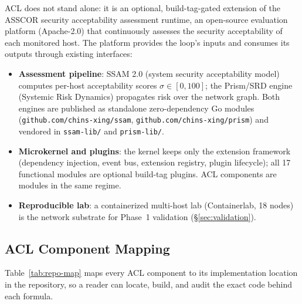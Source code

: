 \documentclass[11pt]{article}
\begin{document}
ACL does not stand alone: it is an optional, build-tag-gated extension of the
ASSCOR security acceptability assessment runtime, an open-source evaluation
platform (Apache-2.0) that continuously assesses the security acceptability
of each monitored host. The platform provides the loop's inputs and
consumes its outputs through existing interfaces:
\begin{itemize}
\item \textbf{Assessment pipeline}: SSAM 2.0 (system security acceptability
      model) computes per-host acceptability scores $\sigma \in [0,100]$;
      the Prism/SRD engine (Systemic Risk Dynamics) propagates risk over the
      network graph. Both engines are published as standalone zero-dependency
      Go modules (\texttt{github.com/chins-xing/ssam},
      \texttt{github.com/chins-xing/prism}) and vendored in
      \texttt{ssam-lib/} and \texttt{prism-lib/}.
\item \textbf{Microkernel and plugins}: the kernel keeps only the extension
      framework (dependency injection, event bus, extension registry, plugin
      lifecycle); all 17 functional modules are optional build-tag plugins.
      ACL components are modules in the same regime.
\item \textbf{Reproducible lab}: a containerized multi-host lab
      (Containerlab, 18 nodes) is the network substrate for Phase~1
      validation (\S\ref{sec:validation}).
\end{itemize}

\subsection{ACL Component Mapping}

Table~\ref{tab:repo-map} maps every ACL component to its implementation
location in the repository, so a reader can locate, build, and audit the
exact code behind each formula.
\end{document}
